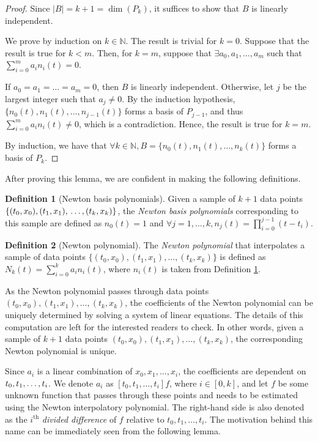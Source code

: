 \documentclass[a4paper,11pt,titlepage]{article}
\theoremstyle{definition}
\newtheorem{definition}{Definition}[section]
\theoremstyle{plain}
\theoremstyle{remark}
\begin{document}
\begin{proof}
    Since $|B|=k+1=\dim(P_k)$, it suffices to show that $B$ is linearly independent.
    
    We prove by induction on $k\in\mathbb{N}$. The result is trivial for $k=0$. Suppose that the result is true for $k<m$. Then, for $k=m$, suppose that $\exists a_0,a_1,\dots,a_m$ such that $\sum_{i=0}^ma_in_i(t)=0$.

    If $a_0=a_1=\dots=a_m=0$, then $B$ is linearly independent. Otherwise, let $j$ be the largest integer such that $a_j\neq0$. By the induction hypothesis, $\{n_0(t),n_1(t),\dots,n_{j-1}(t)\}$ forms a basis of $P_{j-1}$, and thus $\sum_{i=0}^ma_in_i(t)\neq0$, which is a contradiction. Hence, the result is true for $k=m$.

    By induction, we have that $\forall k\in\mathbb{N}, B=\{n_0(t),n_1(t),\dots,n_k(t)\}$ forms a basis of $P_k$.
\end{proof}

After proving this lemma, we are confident in making the following definitions.

\begin{definition}
    [Newton basis polynomials] Given a sample of $k+1$ data points
$\{(t_0,x_0), (t_1,x_1), \\\dots, (t_k,x_k)\}$, the \textit{Newton basis polynomials} corresponding to this sample are defined as $n_0(t)=1$ and $\forall j=1,\dots,k, n_j(t)=\prod_{i=0}^{j-1}(t-t_i)$.
\label{def:nbp}
\end{definition}

\begin{definition}
    [Newton polynomial] The \textit{Newton polynomial} that interpolates a sample of data points $\{(t_0,x_0), (t_1,x_1), \dots, (t_k,x_k)\}$ is defined as $N_k(t)=\sum_{i=0}^ka_in_i(t)$, where $n_i(t)$ is taken from Definition \ref{def:nbp}.
\end{definition}

As the Newton polynomial passes through data points $(t_0,x_0), (t_1,x_1), \dots, (t_k,x_k)$, the coefficients of the Newton polynomial can be uniquely determined by solving a system of linear equations. The details of this computation are left for the interested readers to check. In other words, given a sample of $k+1$ data points
$(t_0,x_0), (t_1,x_1), \dots, (t_k,x_k)$, the corresponding Newton polynomial is unique.

Since $a_i$ is a linear combination of $x_0,x_1,\dots,x_i$, the coefficients are dependent on $t_0,t_1,\dots,\\t_i$. We denote $a_i$ as $[t_0,t_1,\dots,t_i]f$, where $i\in[0,k]$, and let $f$ be some unknown function that passes through these points and needs to be estimated using the Newton interpolatory polynomial. The right-hand side is also denoted as the $i^{\mathrm{th}}$ \textit{divided difference} of $f$ relative to $t_0,t_1,\dots,t_i$. The motivation behind this name can be immediately seen from the following lemma.
\end{document}
